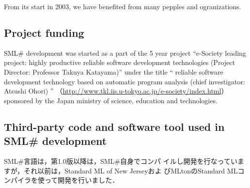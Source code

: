 \documentclass{jbook}
\newif\ifjp
\newcommand{\txt}[2]{#2}
\newcommand{\smlsharp}{SML\#}
\newcommand{\smlsharpSize}{\txt{30万}{0.3 millions}}
\begin{document}
\ifjp%
	2003年にスタートした\smlsharp{}開発の過程では，以下を含む色々な
ご指導やご協力を頂きました．
	ここに謝意を表します．
\else%
	From its start in 2003, we have benefited from many pepples and
ogranizations.
\fi%
	
\subsection{\txt{プロジェクトファンディング}{Project funding}}

\ifjp%
	\smlsharp{}言語の研究開発は，2003年から5年間の文部科学省リーディ
ングプロジェクトe-Society基盤ソフトウェアの総合開発「高い生産性をもつ高
信頼ソフトウェア作成技術の開発」
（\url{http://www.tkl.iis.u-tokyo.ac.jp/e-society/index.html）}
の一つの課題
「プログラムの自動解析に基づく高信頼ソフトウェアシステム構築技術」（究代
表者:大堀 淳）としてスタートをきることができました．
	このプロジェクトの主要な目標が\smlsharp{}言語コンパイラの開発で
した．
	\smlsharp{}は開発ソースの総量が\smlsharpSize{}行を超える大規模シ
ステムです．
	このプロジェクトの支援がなければ，\smlsharp{}の開発は困難であっ
たと思われます．
	文部科学省，e-Societyの領域代表の片山卓也先生，および関係各位に
深謝いたします．
\else%
	\smlsharp{} development was started as a part of the 5 year
project 
``e-Society leading project: highly productive reliable software
development technologies (Project Director: Professor Takuya Katayama)'' 
under the title
``
reliable software development technology based on automatic program analysis
(chief investigator: Atsushi Ohori)
''
（\url{http://www.tkl.iis.u-tokyo.ac.jp/e-society/index.html}）
sponsored by the Japan ministry of science, education and technologies.
\fi%

\subsection{
\txt{\smlsharp{}が使用しているソフトウエア}
    {Third-party code and software tool used in \smlsharp{} development}
}

\ifjp%
	\smlsharp{}言語は，第1.0版以降は，\smlsharp{}自身でコンパ
イルし開発を行なっていますが，それ以前は，Standard ML of New Jerseyおよ
びMLtonのStandard MLコンパイラを使って開発を行いました．
\end{document}
